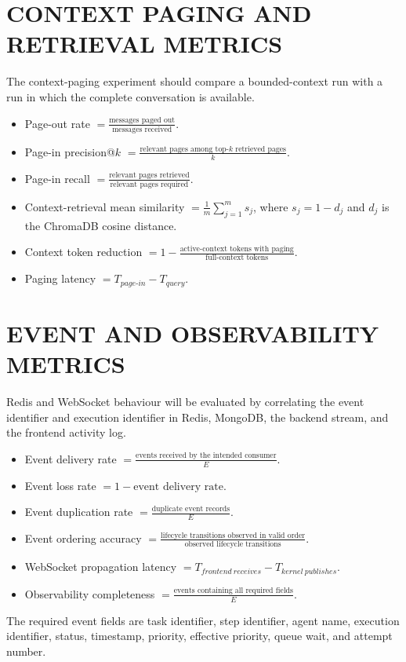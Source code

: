 \section{\uppercase{Context Paging and Retrieval Metrics}}
The context-paging experiment should compare a bounded-context run with a run in which the complete conversation is available.
\begin{itemize}
\item Page-out rate $=\frac{\text{messages paged out}}{\text{messages received}}$.
\item Page-in precision@$k$ $=\frac{\text{relevant pages among top-$k$ retrieved pages}}{k}$.
\item Page-in recall $=\frac{\text{relevant pages retrieved}}{\text{relevant pages required}}$.
\item Context-retrieval mean similarity $=\frac{1}{m}\sum_{j=1}^{m}s_j$, where $s_j=1-d_j$ and $d_j$ is the ChromaDB cosine distance.
\item Context token reduction $=1-\frac{\text{active-context tokens with paging}}{\text{full-context tokens}}$.
\item Paging latency $=T_{page\text{-}in}-T_{query}$.
\end{itemize}

\section{\uppercase{Event and Observability Metrics}}
Redis and WebSocket behaviour will be evaluated by correlating the event identifier and execution identifier in Redis, MongoDB, the backend stream, and the frontend activity log.
\begin{itemize}
\item Event delivery rate $=\frac{\text{events received by the intended consumer}}{E}$.
\item Event loss rate $=1-\text{event delivery rate}$.
\item Event duplication rate $=\frac{\text{duplicate event records}}{E}$.
\item Event ordering accuracy $=\frac{\text{lifecycle transitions observed in valid order}}{\text{observed lifecycle transitions}}$.
\item WebSocket propagation latency $=T_{frontend\ receives}-T_{kernel\ publishes}$.
\item Observability completeness $=\frac{\text{events containing all required fields}}{E}$.
\end{itemize}
The required event fields are task identifier, step identifier, agent name, execution identifier, status, timestamp, priority, effective priority, queue wait, and attempt number.

